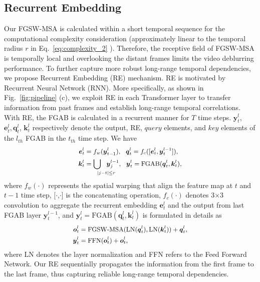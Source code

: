 \documentclass{article}
\begin{document}
	\subsection{Recurrent Embedding}
Our FGSW-MSA is calculated within a short temporal sequence for the computational complexity consideration (approximately linear to the temporal radius $r$ in Eq.~\eqref{eq:complexity_2} ).  Therefore, the receptive field of FGSW-MSA is temporally local and overlooking the distant frames limits the video deblurring  performance. To further capture more robust long-range temporal dependencies, we propose Recurrent Embedding (RE) mechanism. RE is motivated by Recurrent Neural Network (RNN). More specifically, as shown in Fig.~\ref{fig:pipeline} (c), we exploit RE in each Transformer layer to transfer information from past frames and establish long-range temporal correlations. With RE, the FGAB is calculated in a recurrent manner for $T$ time steps. $\boldsymbol{y}^l_t$, $\boldsymbol{e}^l_t, \boldsymbol{q}^l_t$, $\boldsymbol{k}^l_t$ respectively denote the output, RE, $query$ elements, and $key$ elements of the $l_{th}$ FGAB in the $t_{th}$ time step. We have
	\vspace{-1.5mm}
	\begin{equation}
	\small
	\begin{aligned}
	\boldsymbol{e}_t^l &= f_w(\boldsymbol{y}_{t-1}^{l}), 
	~~\boldsymbol{q}_t^l = f_c([\boldsymbol{e}_t^l, \boldsymbol{y}_t^{l-1}]), \\
	\boldsymbol{k}_t^l &= \underset{\footnotesize |j-t| \leq r}{\bigcup~~\boldsymbol{y}_j^{l-1}}, 
	~~\boldsymbol{y}_t^l = \text{FGAB}(\boldsymbol{q}_t^l, \boldsymbol{k}_t^l), \\
	\label{eq:RE_1}
	\end{aligned}
	\vspace{-7.5mm}
	\end{equation}
	where $f_w(\cdot)$ represents the spatial warping that align the feature map at $t$ and ${t-1}$ time step, [$\cdot$,$\cdot$] is the concatenating operation, $f_c(\cdot)$ denotes 3$\times$3 convolution to aggregate the recurrent embedding $\boldsymbol{e}_t^l$ and the output from last FGAB layer $\boldsymbol{y}_t^{l-1}$, and $\boldsymbol{y}_t^l  = \text{FGAB}(\boldsymbol{q}_t^l, \boldsymbol{k}_t^l)$ is formulated in details as
	\vspace{-1.5mm}
	\begin{equation}
	\small
	\begin{aligned}
	\boldsymbol{o}_t^l &= \text{FGSW-MSA}(\text{LN}(\boldsymbol{q}_t^l), \text{LN}(\boldsymbol{k}_t^l) )+ \boldsymbol{q}_t^l, \\
	\boldsymbol{y}_t^l &= \text{FFN}(\boldsymbol{o}_t^l)+\boldsymbol{o}_t^l, \\
	\label{eq:RE_2}
	\end{aligned}
	\vspace{-5.5mm}
	\end{equation}
	where LN denotes the layer normalization and FFN refers to the Feed Forward Network. Our RE sequentially propagates the information from the first frame to the last frame, thus capturing reliable long-range temporal dependencies.
	
\end{document}
